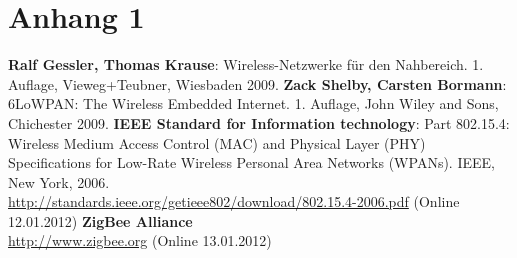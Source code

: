 \appendix

\section{Anhang 1}

\listoffigures

\listoftables

\lstlistoflistings

\printglossary[toctitle=Glossar]

\begin{thebibliography}{}
   \textbf{Ralf Gessler, Thomas Krause}: Wireless-Netzwerke für den Nahbereich. 1.  Auflage, Vieweg+Teubner, Wiesbaden 2009.
   \textbf{Zack Shelby, Carsten Bormann}: 6LoWPAN: The Wireless Embedded Internet. 1.  Auflage, John Wiley and Sons, Chichester 2009.
   \textbf{IEEE Standard for Information technology}: Part 802.15.4: Wireless Medium Access Control (MAC) and Physical Layer (PHY) Specifications for Low-Rate Wireless Personal Area Networks (WPANs). IEEE, New York, 2006.\\
\url{http://standards.ieee.org/getieee802/download/802.15.4-2006.pdf} (Online 12.01.2012)
   \textbf{ZigBee Alliance}\\
\url{http://www.zigbee.org} (Online 13.01.2012)
\end{thebibliography}
